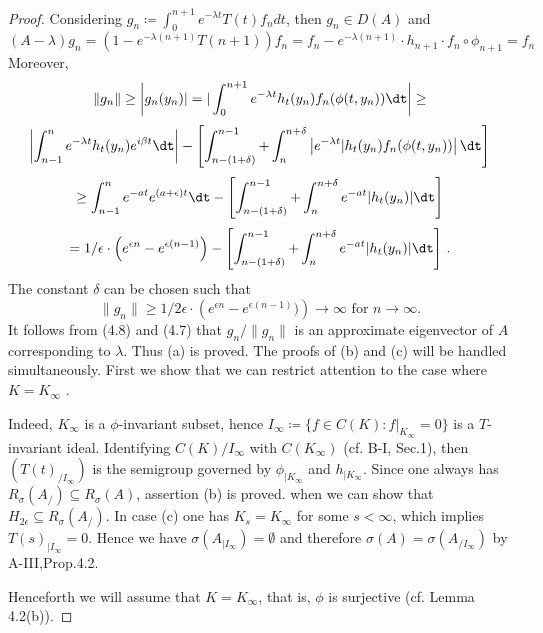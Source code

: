 \begin{proof}
	Considering $g_{n}\coloneq \int_{0}^{n+1} e^{-\lambda t} T(t)f_{n} dt$, then $g_{n} \in D(A)$ and
	\begin{equation}\label{eq:b3-4.7}
		(A - \lambda)g_{n} = (1 - e^{-\lambda(n+1)}T(n+1))f_{n} = f_{n} - e^{-\lambda(n+1)} \cdot h_{n+1} \cdot f_{n} \circ \phi_{n+1} = f_{n}
	\end{equation}
	Moreover,
	\[\|g_{n}\| \geq \left|g_{n}(y_{n})| = |\int_{0}^{n+1} e^{-\lambda t} h_{t}(y_{n})f_{n}(\phi(t,y_{n})) \dt\right| \geq\]
	\[\left|\int_{n-1}^{n} e^{-\lambda t} h_{t}(y_{n}) e^{i\beta t} \dt\right| - \left[\int_{n-(1+\delta)}^{n-1} + \int_{n}^{n+\delta}\left| e^{-\lambda t}|h_{t}(y_{n})f_{n}(\phi(t,y_{n}))\right| \dt\right]\]
	\[\geq \int_{n-1}^{n} e^{-at} e^{(a+\epsilon)t} \dt - \left[\int_{n-(1+\delta)}^{n-1} + \int_{n}^{n+\delta} e^{-at}|h_{t}(y_{n})| \dt\right]\]
	\[= 1/\epsilon \cdot\left(e^{\epsilon n} - e^{\epsilon(n-1)}\right) - \left[\int_{n-(1+\delta)}^{n-1} + \int_{n}^{n+\delta} e^{-at}|h_{t}(y_{n})| \dt\right]\,.\]
	The constant $\delta$ can be chosen such that
	\begin{equation}\label{eq:b3-4.8}
		\|g_{n}\| \geq 1/2\epsilon \cdot\left(e^{\epsilon n} - e^{\epsilon(n-1)})\right) \to \infty \text{ for } n \to \infty.
	\end{equation}
	It follows from (4.8) and (4.7) that $ g_n / \|g_n\|$ is an approximate
	eigenvector of $A$ corresponding to $\lambda$. Thus (a) is proved. The 
	proofs of (b) and (c) will be handled simultaneously. First we show that we can restrict attention to the case where $K = K_\infty$ .
	
	
	Indeed, $K_{\infty}$ is a $\phi$-invariant subset, hence $I_{\infty}\coloneq \{f \in C(K) : f|_{K_{\infty}} = 0\}$ is a $T$-invariant ideal.
	Identifying $C(K)/I_{\infty}$ with $C(K_{\infty})$ (cf. B-I, Sec.1), then $(T(t)_{/I_{\infty}})$ is the semigroup governed by $\phi_{|K_{\infty}}$ and $h_{|K_{\infty}}$.
	Since one always has $R_{\sigma}(A_{/}) \subseteq R_{\sigma}(A)$, assertion (b) is proved.
%
%
	when we can show that $H_{2\epsilon} \subseteq R_{\sigma}(A_{/})$.
	In case (c) one has $K_{s} = K_{\infty}$ for some $s < \infty$, which implies $T(s)_{|I_{\infty}} = 0$.
	Hence we have $\sigma(A_{|I_{\infty}}) = \emptyset$ and therefore $\sigma(A) = \sigma(A_{/I_{\infty}})$ by A-III,Prop.4.2.
	
	Henceforth we will assume that $K = K_{\infty}$, that is, $\phi$ is surjective (cf. Lemma 4.2(b)).
	

\end{proof}
